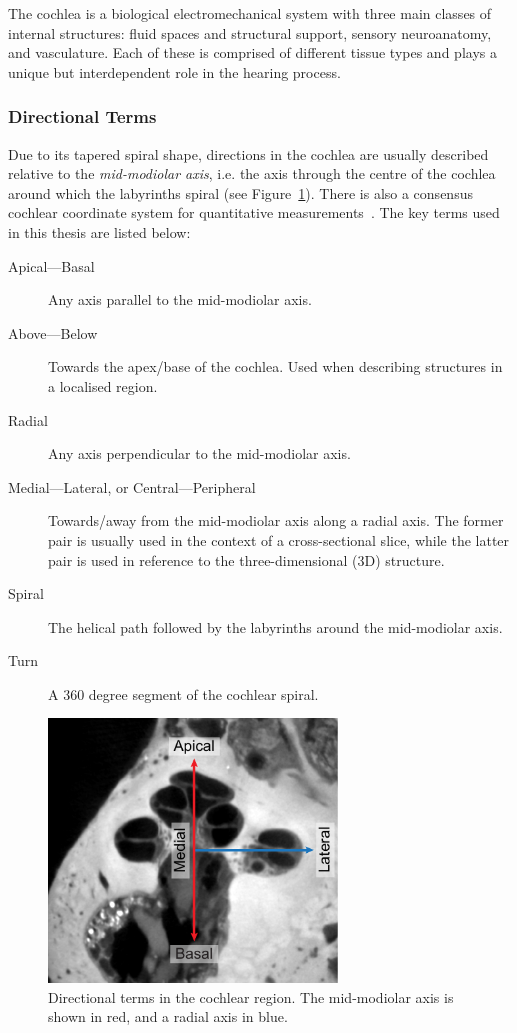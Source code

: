 The cochlea is a biological electromechanical system with three main classes of
internal structures: fluid spaces and structural support, sensory neuroanatomy,
and vasculature. Each of these is comprised of different tissue types and plays
a unique but interdependent role in the hearing process.

\subsubsection{Directional Terms}

Due to its tapered spiral shape, directions in the cochlea are usually described
relative to the \emph{mid-modiolar axis}, i.e. the axis through the centre of
the cochlea around which the labyrinths spiral (see
Figure~\ref{fig:directions}). There is also a consensus cochlear coordinate
system for quantitative measurements~\cite{verbist2010}. The key terms used in
this thesis are listed below:

\begin{description}
	\item[\textsf{Apical---Basal}] Any axis parallel to the mid-modiolar axis.
	\item[\textsf{Above---Below}] Towards the apex/base of the cochlea. Used when
	describing structures in a localised region.
	\item[\textsf{Radial}] Any axis perpendicular to the mid-modiolar axis.
	\item[\textsf{Medial---Lateral, or Central---Peripheral}] Towards/away from the
	mid-modiolar axis along a radial axis. The former pair is usually used in the
	context of a cross-sectional slice, while the latter pair is used in reference
	to the three-dimensional (3D) structure.
	\item[\textsf{Spiral}] The helical path followed by the labyrinths around the
	mid-modiolar axis.
	\item[\textsf{Turn}] A 360 degree segment of the cochlear spiral.
\end{description}

\begin{figure}
	\centering
	\includegraphics[height=7cm]{Background/directions}
	\caption[Directional terms in the cochlear region]{Directional terms in the
	cochlear region. The mid-modiolar axis is shown in red, and a radial axis in
	blue.}
	\label{fig:directions}
\end{figure}


